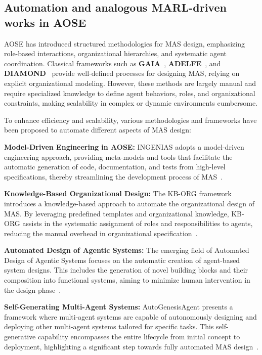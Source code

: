 \documentclass[pdflatex,sn-mathphys-num]{sn-jnl}%
\theoremstyle{thmstyleone}%
\theoremstyle{thmstyletwo}%
\theoremstyle{thmstylethree}%
\begin{document}
\subsection{Automation and analogous MARL-driven works in AOSE}\label{sub-sec:rel_aose_automate_marl}

AOSE has introduced structured methodologies for MAS design, emphasizing role-based interactions, organizational hierarchies, and systematic agent coordination. Classical frameworks such as \textbf{GAIA}~\cite{gaia1998}, \textbf{ADELFE}~\cite{adelfe2002}, and \textbf{DIAMOND}~\cite{Jamont2005} provide well-defined processes for designing MAS, relying on explicit organizational modeling. However, these methods are largely manual and require specialized knowledge to define agent behaviors, roles, and organizational constraints, making scalability in complex or dynamic environments cumbersome.

To enhance efficiency and scalability, various methodologies and frameworks have been proposed to automate different aspects of MAS design:

\textbf{Model-Driven Engineering in AOSE:} INGENIAS adopts a model-driven engineering approach, providing meta-models and tools that facilitate the automatic generation of code, documentation, and tests from high-level specifications, thereby streamlining the development process of MAS~\cite{Pavon2003}.

\textbf{Knowledge-Based Organizational Design:} The KB-ORG framework introduces a knowledge-based approach to automate the organizational design of MAS. By leveraging predefined templates and organizational knowledge, KB-ORG assists in the systematic assignment of roles and responsibilities to agents, reducing the manual overhead in organizational specification~\cite{Sims2008}.

\textbf{Automated Design of Agentic Systems:} The emerging field of Automated Design of Agentic Systems focuses on the automatic creation of agent-based system designs. This includes the generation of novel building blocks and their composition into functional systems, aiming to minimize human intervention in the design phase~\cite{smith2024automated}.

\textbf{Self-Generating Multi-Agent Systems:} AutoGenesisAgent presents a framework where multi-agent systems are capable of autonomously designing and deploying other multi-agent systems tailored for specific tasks. This self-generative capability encompasses the entire lifecycle from initial concept to deployment, highlighting a significant step towards fully automated MAS design~\cite{harper2024autogenesisagent}.
\end{document}
